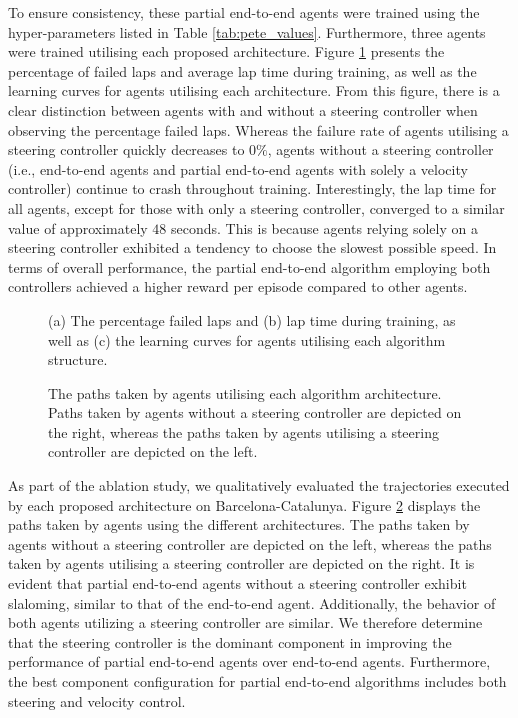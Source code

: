 To ensure consistency, these partial end-to-end agents were trained using the hyper-parameters listed in Table \ref{tab:pete_values}.
Furthermore, three agents were trained utilising each proposed architecture.
Figure \ref{fig:architecture_train} presents the percentage of failed laps and average lap time during training, as well as the learning curves for agents utilising each architecture.
From this figure, there is a clear distinction between agents with and without a steering controller when observing the percentage failed laps.
Whereas the failure rate of agents utilising a steering controller quickly decreases to $0\%$, agents without a steering controller (i.e., end-to-end agents and partial end-to-end agents with solely a velocity controller) continue to crash throughout training.
Interestingly, the lap time for all agents, except for those with only a steering controller, converged to a similar value of approximately $48$ seconds. 
This is because agents relying solely on a steering controller exhibited a tendency to choose the slowest possible speed.
In terms of overall performance, the partial end-to-end algorithm employing both controllers achieved a higher reward per episode compared to other agents. 

\begin{figure}[t]
    \centering
    
    \caption[Learning curves for agents utilising each algorithm structure]{(a) The percentage failed laps and (b) lap time during training, as well as (c) the learning curves for agents utilising each algorithm structure.}
    \label{fig:architecture_train}
\end{figure}

\begin{figure}[b]
    \centering
    
    \caption[Paths taken by agents utilising each algorithm architecture]{The paths taken by agents utilising each algorithm architecture. Paths taken by agents without a steering controller are depicted on the right, whereas the paths taken by agents utilising a steering controller are depicted on the left.}
    \label{fig:architecture_esp}
\end{figure}

As part of the ablation study, we qualitatively evaluated the trajectories executed by each proposed architecture on Barcelona-Catalunya.
Figure \ref{fig:architecture_esp} displays the paths taken by agents using the different architectures.
The paths taken by agents without a steering controller are depicted on the left, whereas the paths taken by agents utilising a steering controller are depicted on the right.
It is evident that partial end-to-end agents without a steering controller exhibit slaloming, similar to that of the end-to-end agent. 
Additionally, the behavior of both agents utilizing a steering controller are similar.
We therefore determine that the steering controller is the dominant component in improving the performance of partial end-to-end agents over end-to-end agents. 
Furthermore, the best component configuration for partial end-to-end algorithms includes both steering and velocity control.

